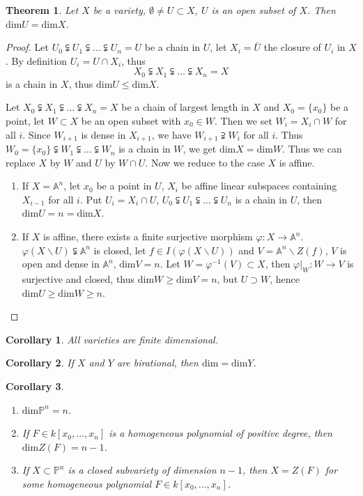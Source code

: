 \documentclass{amsart}
\theoremstyle{plain}
\newtheorem{theorem}{Theorem}
\newtheorem{corollary}{Corollary}
\theoremstyle{definition}
\theoremstyle{remark}
\numberwithin{equation}{section}
\begin{document}
\begin{theorem}\label{15-2}
	Let $ X $ be a variety, $ \emptyset\neq U\subset X $, $ U $ is an open subset of $ X $. Then $ \text{dim}U=\text{dim}X $.
\end{theorem}
\begin{proof}
	Let $ U_0\subsetneqq U_1\subsetneqq \dots\subsetneqq U_n=U $ be a chain in $ U $, let $ X_i=\bar{U} $ the closure of $ U_i $ in $ X $. By definition $ U_i=U\cap X_i $, thus 
	$$
	X_0\subsetneqq X_1\subsetneqq \dots \subsetneqq  X_n=X
	$$
	is a chain in $ X $, thus $ \text{dim}U\leq \text{dim}X $.
	
	Let $ X_0\subsetneqq X_1\subsetneqq \dots\subsetneqq X_n=X $ be a chain of largest length in $ X $ and $ X_0=\lbrace x_0\rbrace $ be a point, let $ W\subset X $ be an open subset with $ x_0\in W $. Then we set $ W_i=X_i\cap W $ for all $ i $. Since $ W_{i+1} $ is dense in $ X_{i+1} $, we have $ W_{i+1}\supsetneqq W_i $ for all $ i $. Thus $ W_0=\lbrace x_0\rbrace\subsetneqq W_1\subsetneqq \dots\subsetneqq W_n $ is a chain in $ W $, we get $ \text{dim}X=\text{dim}W $. Thus we can replace $ X $ by $ W $ and $ U $ by $ W\cap U $. Now we reduce to the case $ X $ is affine.
	\begin{enumerate}
		\item If $ X=\mathbb{A}^n $, let $ x_0 $ be a point in $ U $, $ X_i $ be affine linear subspaces containing $ X_{i-1} $ for all $ i $. Put $ U_i=X_i\cap U $,  $ U_0\subsetneqq U_1\subsetneqq \dots\subsetneqq U_n $ is a chain in $ U $, then $ \text{dim}U=n=\text{dim}X $.
		\item If $ X $ is affine, there exists a finite surjective morphism $ \varphi:X\to \mathbb{A}^n $. $ \varphi(X\backslash U)\subsetneqq \mathbb{A}^n $ is closed, let $ f\in I(\varphi(X\backslash U)) $ and $ V=\mathbb{A}^n\backslash Z(f) $, $ V $ is open and dense in $ \mathbb{A}^n $, $ \text{dim}V=n $. Let $ W=\varphi^{-1}(V)\subset X $, then $ \varphi|_W:W\to V $ is surjective and closed, thus $ \text{dim}W\geq \text{dim}V=n $, but $ U\supset W $, hence $ \text{dim}U\geq \text{dim}W\geq n $. 
	\end{enumerate} 
\end{proof}
\begin{corollary}
	All varieties are finite dimensional.
\end{corollary}
\begin{corollary}
	If $ X $ and $ Y $ are birational, then $ \text{dim}=\text{dim}Y $.
\end{corollary}
\begin{corollary}
	\begin{enumerate}
		\item $ \text{dim}\mathbb{P}^n=n $.
		\item If $ F\in k[x_0,\dots,x_n] $ is a homogeneous polynomial of positive degree, then $ \text{dim}Z(F)=n-1 $.
		\item If $ X\subset \mathbb{P}^n $ is a closed subvariety of dimension $ n-1 $, then $ X=Z(F) $ for some homogeneous polynomial $ F\in k[x_0,\dots,x_n] $.
	\end{enumerate}
\end{corollary}
\end{document}
